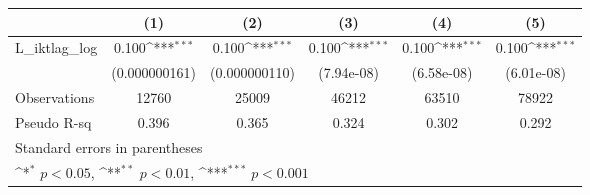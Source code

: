 {
\def\sym#1{\ifmmode^{#1}\else\(^{#1}\)\fi}
\begin{tabular}{l*{5}{c}}
\hline\hline
                &\multicolumn{1}{c}{(1)}         &\multicolumn{1}{c}{(2)}         &\multicolumn{1}{c}{(3)}         &\multicolumn{1}{c}{(4)}         &\multicolumn{1}{c}{(5)}         \\
\hline
L\_iktlag\_log    &    0.100\sym{***}&    0.100\sym{***}&    0.100\sym{***}&    0.100\sym{***}&    0.100\sym{***}\\
                &(0.000000161)         &(0.000000110)         &(7.94e-08)         &(6.58e-08)         &(6.01e-08)         \\
\hline
Observations    &    12760         &    25009         &    46212         &    63510         &    78922         \\
Pseudo R-sq     &    0.396         &    0.365         &    0.324         &    0.302         &    0.292         \\
\hline\hline
\multicolumn{6}{l}{\footnotesize Standard errors in parentheses}\\
\multicolumn{6}{l}{\footnotesize \sym{*} \(p<0.05\), \sym{**} \(p<0.01\), \sym{***} \(p<0.001\)}\\
\end{tabular}
}
